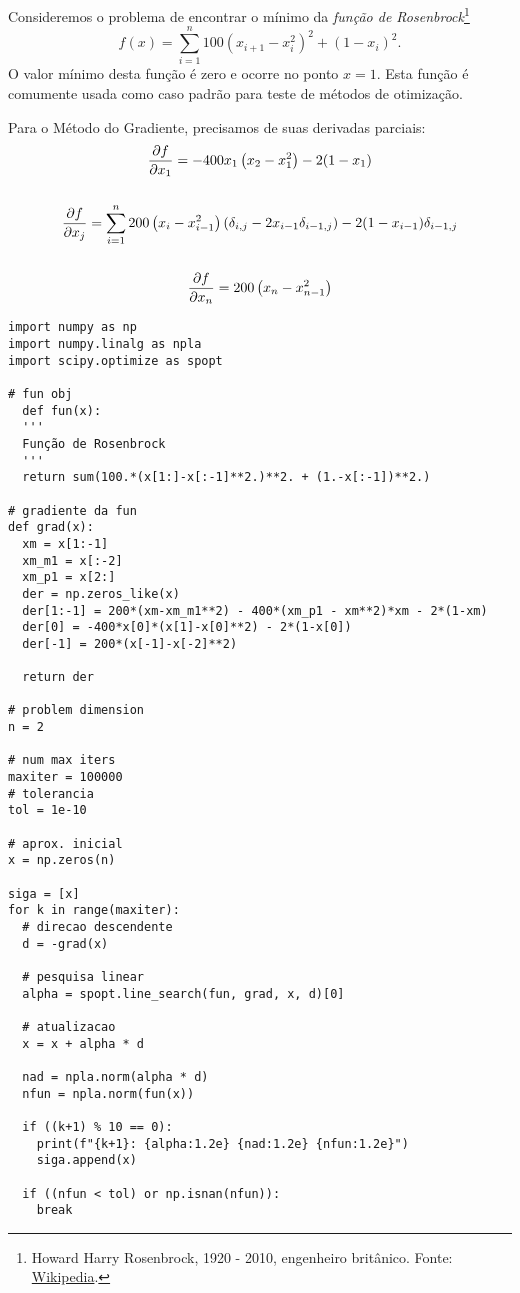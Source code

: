 \begin{ex}\label{ex:Rosenbrock}
  Consideremos o problema de encontrar o mínimo da \emph{função de Rosenbrock}\footnote{Howard Harry Rosenbrock, 1920 - 2010, engenheiro britânico. Fonte: \href{https://en.wikipedia.org/wiki/Howard_Harry_Rosenbrock}{Wikipedia}.}
  \begin{equation}
    f(x) = \sum_{i=1}^n 100\left(x_{i+1}-x_i^2\right)^2 + (1-x_i)^2.
  \end{equation}
  O valor mínimo desta função é zero e ocorre no ponto $x=1$. Esta função é comumente usada como caso padrão para teste de métodos de otimização.

  Para o Método do Gradiente, precisamos de suas derivadas parciais:
  \begin{gather}
    \frac{\partial f}{\partial x_1} = -400x_1\left(x_2-x_1^2\right) - 2(1-x_1)\\
    ~\nonumber\\
    \frac{\partial f}{\partial x_j} = \sum_{i=1}^n 200\left(x_i-x_{i-1}^2\right)(\delta_{i,j}-2x_{i-1}\delta_{i-1,j})-2(1-x_{i-1})\delta_{i-1,j}\\
    ~\nonumber\\
    \frac{\partial f}{\partial x_{n}} = 200\left(x_n - x_{n-1}^2\right)
  \end{gather}


  \begin{lstlisting}[caption=Algoritmo do Gradiente, label={lst:algOtimMG}]
import numpy as np
import numpy.linalg as npla
import scipy.optimize as spopt

# fun obj
  def fun(x):
  '''
  Função de Rosenbrock
  '''
  return sum(100.*(x[1:]-x[:-1]**2.)**2. + (1.-x[:-1])**2.)

# gradiente da fun
def grad(x):
  xm = x[1:-1]
  xm_m1 = x[:-2]
  xm_p1 = x[2:]
  der = np.zeros_like(x)
  der[1:-1] = 200*(xm-xm_m1**2) - 400*(xm_p1 - xm**2)*xm - 2*(1-xm)
  der[0] = -400*x[0]*(x[1]-x[0]**2) - 2*(1-x[0])
  der[-1] = 200*(x[-1]-x[-2]**2)
  
  return der

# problem dimension
n = 2

# num max iters
maxiter = 100000
# tolerancia
tol = 1e-10

# aprox. inicial
x = np.zeros(n)

siga = [x]
for k in range(maxiter):
  # direcao descendente
  d = -grad(x)

  # pesquisa linear
  alpha = spopt.line_search(fun, grad, x, d)[0]

  # atualizacao
  x = x + alpha * d

  nad = npla.norm(alpha * d)
  nfun = npla.norm(fun(x))

  if ((k+1) % 10 == 0):
    print(f"{k+1}: {alpha:1.2e} {nad:1.2e} {nfun:1.2e}")
    siga.append(x)

  if ((nfun < tol) or np.isnan(nfun)):
    break
  \end{lstlisting}
\end{ex}

